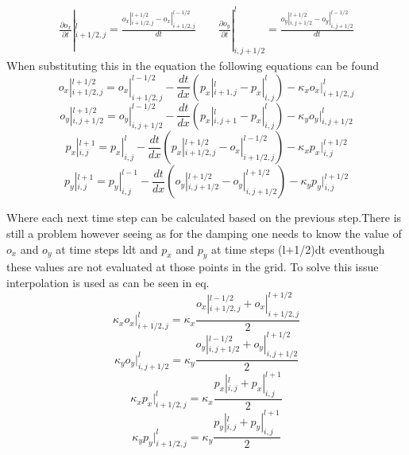 \documentclass{article}
\begin{document}
\begin{equation}
\begin{gathered}
\frac{\partial o_x}{\partial t}|_{i+1/2,j}^{l}  = \frac{o_x|_{i+1/2,j}^{l+1/2}-o_x|_{i+1/2,j}^{l-1/2}}{dt} \qquad
\frac{\partial o_y}{\partial t}|_{i,j+1/2}^{l}  = \frac{o_y|_{i,j+1/2}^{l+1/2}-o_y|_{i,j+1/2}^{l-1/2}}{dt} 
\end{gathered}
\end{equation}
When substituting this in the equation the following equations can be found
\begin{equation}
    o_x|_{i+1/2,j}^{l+1/2}=o_x|_{i+1/2,j}^{l-1/2}-\frac{dt}{dx}(p_x|_{i+1,j}^l-p_x|_{i,j}^l)-\kappa_x o_x|_{i+1/2,j}^l
\end{equation}
\begin{equation}
    o_y|_{i,j+1/2}^{l+1/2}=o_y|_{i,j+1/2}^{l-1/2}-\frac{dt}{dx}(p_x|_{i,j+1}^l-p_x|_{i,j}^l)-\kappa_y o_y|_{i,j+1/2}^l
\end{equation}
\begin{equation}
    p_x|_{i,j}^{l+1}=p_x|_{i,j}^{l}-\frac{dt}{dx}(p_x|_{i+1/2,j}^{l+1/2}-o_x|_{i+1/2,j}^{l-1/2})-\kappa_x p_x|_{i,j}^{l+1/2}
\end{equation}
\begin{equation}
    p_y|_{i,j}^{l+1}=p_y|_{i,j}^{l-1}-\frac{dt}{dx}(o_y|_{i,j+1/2}^{l+1/2}-o_y|_{i,j+1/2}^{l+1/2})-\kappa_y p_y|_{i,j}^{l+1/2}
\end{equation}

Where each next time step can be calculated based on the previous step.There is still a problem however seeing as for the damping one needs to know the value of $o_x$ and $o_y$ at time steps ldt and $p_x$ and $p_y$ at time steps (l+1/2)dt eventhough these values are not evaluated at those points in the grid. To solve this issue interpolation is used as can be seen in eq.
\begin{equation}
    \kappa_x o_x|_{i+1/2,j}^l= \kappa_x \frac{o_x|_{i+1/2,j}^{l-1/2}+o_x|_{i+1/2,j}^{l+1/2}}{2}
\end{equation}
\begin{equation}
    \kappa_y o_y|_{i,j+1/2}^l= \kappa _y \frac{o_y|_{i,j+1/2}^{l-1/2}+o_y|_{i,j+1/2}^{l+1/2}}{2}
\end{equation}
\begin{equation}
    \kappa_x p_x|_{i+1/2,j}^l= \kappa_x \frac{p_x|_{i,j}^{l}+p_x|_{i,j}^{l+1}}{2}
\end{equation}
\begin{equation}
    \kappa_y p_y|_{i+1/2,j}^l= \kappa_y \frac{p_y|_{i,j}^{l}+p_y|_{i,j}^{l+1}}{2}
\end{equation}
\end{document}
